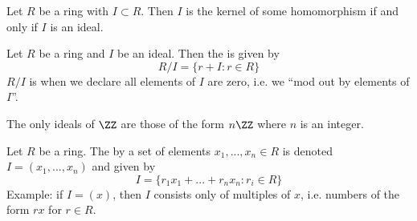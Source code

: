 \documentclass{article}
\begin{document}
\begin{theorem}
  Let $R$ be a ring with $I \subset R$. Then $I$ is the kernel of some homomorphism
  if and only if $I$ is an ideal. 
\end{theorem}

\begin{defn}
  Let $R$ be a ring and $I$ be an ideal. Then the  is given by
  $$R/I = \{r + I : r \in R\}$$
  $R/I$ is when we declare all elements of $I$ are zero, i.e. we ``mod out by
  elements of $I$''. 
\end{defn}

\begin{theorem}
  The only ideals of $\ZZ$ are those of the form $n\ZZ$ where $n$ is an integer. 
\end{theorem}

\begin{defn}
  Let $R$ be a ring. The  by a set of elements
  $x_1, ..., x_n \in R$ is denoted $I = (x_1, ..., x_n)$ and given by
  $$I = \{r_1x_1 + ... + r_nx_n : r_i \in R\}$$
  Example: if $I = (x)$, then $I$ consists only of multiples of $x$, i.e. numbers
  of the form $rx$ for $r \in R$. 
\end{defn}
\end{document}
